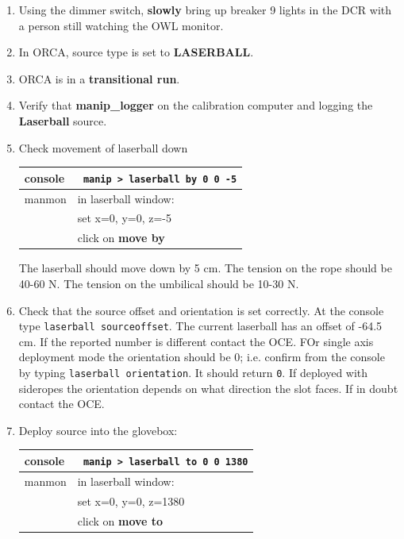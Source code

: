 \documentclass[11pt]{article}
\begin{document}
\begin{enumerate}
\item \CheckBox[name=rluo37]{} Using the dimmer switch, {\bf slowly} bring up breaker 9 lights in the DCR with a person still watching the OWL monitor.
\item \CheckBox[name=rluo38]{} In ORCA, source type is set to {\bf LASERBALL}.
\item \CheckBox[name=rluo39]{} ORCA is in a {\bf transitional run}.
\item \CheckBox[name=rluo40]{} Verify that {\bf manip\_logger} on the calibration computer and logging the {\bf Laserball} source.
\item \CheckBox[name=rluo41]{} Check movement of laserball down
\begin{center}
\begin{tabular}{|l|l|}
\hline
console & \verb+ manip > laserball by 0 0 -5+ \\
\hline
manmon & in laserball window: \\ &  set x=0, y=0, z=-5 \\ & click on {\bf move by} \\
\hline
\end{tabular}
\end{center}
The laserball should move down by 5 cm. The tension on the rope should be 40-60 N. The tension on the umbilical should be 10-30 N.
\item \CheckBox[name=rluo42]{} Check that the source offset and orientation is set correctly. At the console type \verb+laserball sourceoffset+. The current laserball has an offset of -64.5 cm. If the reported number is different contact the OCE. FOr single axis deployment mode the orientation should be 0; i.e. confirm from the console by typing \verb+laserball orientation+. It should return \verb+0+. If deployed with sideropes the orientation depends on what direction the slot faces. If in doubt contact the OCE.
\item \CheckBox[name=rluo43]{} Deploy source into the glovebox:
\begin{center}
\begin{tabular}{|l|l|}
\hline
console & \verb+ manip > laserball to 0 0 1380+ \\
\hline
manmon & in laserball window: \\ &  set x=0, y=0, z=1380 \\ & click on {\bf move to} \\
\hline
\end{tabular}
\end{center}


\end{enumerate}
\end{document}
